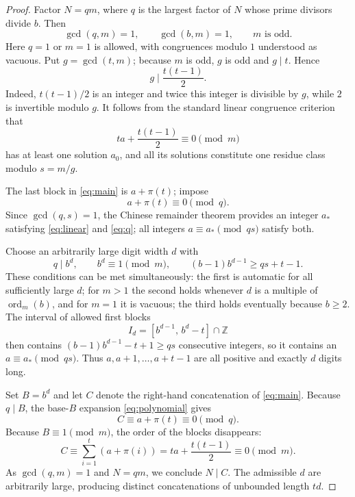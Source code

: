 \documentclass[10pt]{article}
\newcommand{\ord}{\operatorname{ord}}
\begin{document}
\begin{proof}
Factor $N=qm$, where $q$ is the largest factor of $N$ whose prime
divisors divide $b$. Then
\begin{equation}\label{eq:factor}
\gcd(q,m)=1,\qquad\gcd(b,m)=1,\qquad m\text{ is odd}.
\end{equation}
Here $q=1$ or $m=1$ is allowed, with congruences modulo $1$
understood as vacuous. Put $g=\gcd(t,m)$; because $m$ is odd,
$g$ is odd and $g\mid t$. Hence
\begin{equation}\label{eq:obstruction}
 g\mid\frac{t(t-1)}2.
\end{equation}
Indeed, $t(t-1)/2$ is an integer and twice this integer is
divisible by $g$, while $2$ is invertible modulo $g$.
It follows from the standard linear congruence criterion that
\begin{equation}\label{eq:linear}
 t a+\frac{t(t-1)}2\equiv0\pmod m
\end{equation}
has at least one solution $a_0$, and all its solutions constitute
one residue class modulo $s=m/g$.

The last block in \eqref{eq:main} is $a+\pi(t)$; impose
\begin{equation}\label{eq:q}
 a+\pi(t)\equiv0\pmod q.
\end{equation}
Since $\gcd(q,s)=1$, the Chinese remainder theorem provides
an integer $a_*$ satisfying \eqref{eq:linear} and \eqref{eq:q};
all integers $a\equiv a_*\pmod{qs}$ satisfy both.

Choose an arbitrarily large digit width $d$ with
\begin{equation}\label{eq:choose_d}
 q\mid b^d,\qquad b^d\equiv1\pmod m,\qquad
 (b-1)b^{d-1}\ge qs+t-1.
\end{equation}
These conditions can be met simultaneously: the first is automatic
for all sufficiently large $d$; for $m>1$ the second holds whenever
$d$ is a multiple of $\ord_m(b)$, and for $m=1$ it is vacuous;
the third holds eventually because $b\ge2$.
The interval of allowed first blocks
\[
 I_d=[b^{d-1},\,b^d-t]\cap\mathbb Z
\]
then contains $(b-1)b^{d-1}-t+1\ge qs$ consecutive integers,
so it contains an $a\equiv a_*\pmod{qs}$.
Thus $a,a+1,\ldots,a+t-1$ are all positive and exactly $d$ digits long.

Set $B=b^d$ and let $C$ denote the right-hand concatenation of
\eqref{eq:main}. Because $q\mid B$, the base-$B$ expansion
\eqref{eq:polynomial} gives
\[
 C\equiv a+\pi(t)\equiv0\pmod q.
\]
Because $B\equiv1\pmod m$, the order of the blocks disappears:
\[
 C\equiv\sum_{i=1}^{t}(a+\pi(i))
  =ta+\frac{t(t-1)}2\equiv0\pmod m.
\]
As $\gcd(q,m)=1$ and $N=qm$, we conclude $N\mid C$.
The admissible $d$ are arbitrarily large, producing distinct
concatenations of unbounded length $td$.
\end{proof}
\end{document}
